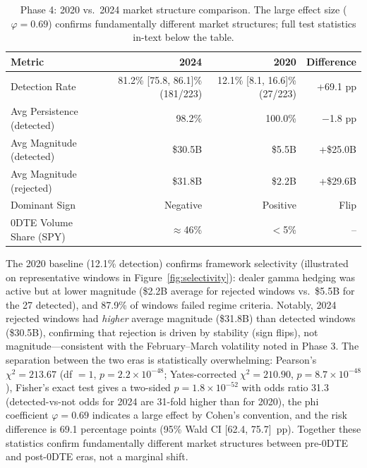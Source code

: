 \begin{table}[H]
\centering
\caption{Phase 4: 2020 vs.\ 2024 market structure comparison. The large effect size ($\varphi = 0.69$) confirms fundamentally different market structures; full test statistics in-text below the table.}
\label{tab:phase4}
\begin{tabular}{lrrr}
\toprule
\textbf{Metric} & \textbf{2024} & \textbf{2020} & \textbf{Difference} \\
\midrule
Detection Rate & 81.2\% [75.8, 86.1]\% (181/223) & 12.1\% [8.1, 16.6]\% (27/223) & +69.1 pp \\
Avg Persistence (detected) & 98.2\% & 100.0\% & $-$1.8 pp \\
Avg Magnitude (detected) & \$30.5B & \$5.5B & +\$25.0B \\
Avg Magnitude (rejected) & \$31.8B & \$2.2B & +\$29.6B \\
Dominant Sign & Negative & Positive & Flip \\
0DTE Volume Share (SPY) & $\approx$46\% & $<$5\% & -- \\
\bottomrule
\end{tabular}
\end{table}

The 2020 baseline (12.1\% detection) confirms framework selectivity (illustrated on representative windows in Figure~\ref{fig:selectivity}): dealer gamma hedging was active but at lower magnitude (\$2.2B average for rejected windows vs.\ \$5.5B for the 27 detected), and 87.9\% of windows failed regime criteria. Notably, 2024 rejected windows had \textit{higher} average magnitude (\$31.8B) than detected windows (\$30.5B), confirming that rejection is driven by stability (sign flips), not magnitude---consistent with the February--March volatility noted in Phase 3. The separation between the two eras is statistically overwhelming:
Pearson's $\chi^2 = 213.67$ (df $= 1$, $p = 2.2 \times 10^{-48}$; Yates-corrected $\chi^2 = 210.90$, $p = 8.7 \times 10^{-48}$),
Fisher's exact test gives a two-sided $p = 1.8 \times 10^{-52}$ with odds ratio 31.3 (detected-vs-not odds for 2024 are 31-fold higher than for 2020),
the phi coefficient $\varphi = 0.69$ indicates a large effect by Cohen's convention,
and the risk difference is 69.1 percentage points (95\% Wald CI [62.4, 75.7]~pp).
Together these statistics confirm fundamentally different market structures between pre-0DTE and post-0DTE eras, not a marginal shift.

